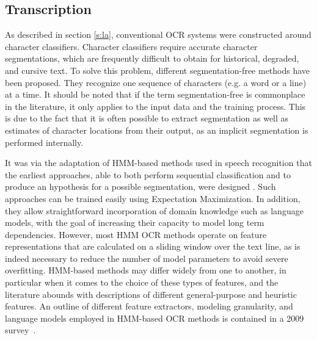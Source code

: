 \subsection{Transcription}

As described in section \ref{s:la}, conventional OCR systems were constructed
around character classifiers. Character classifiers require accurate character
segmentations, which are frequently difficult to obtain for historical,
degraded, and cursive text. To solve this problem, different segmentation-free
methods have been proposed. They recognize one sequence of characters (e.g. a
word or a line) at a time. It should be noted that if the term
segmentation-free is commonplace in the literature, it only applies to the
input data and the training process. This is due to the fact that it is often
possible to extract segmentation as well as estimates of character locations
from their output, as an implicit segmentation is performed internally.

It was via the adaptation of HMM-based methods used in speech recognition that
the earliest approaches, able to both perform sequential classification and to
produce an hypothesis for a possible segmentation, were designed
\cite{kaltenmeier1993sophisticated,rigoll1996comparison}. Such approaches can
be trained easily using Expectation Maximization. In addition, they allow
straightforward incorporation of domain knowledge such as language models, with
the goal of increasing their capacity to model long term dependencies. However,
most HMM OCR methods operate on feature representations that are calculated on
a sliding window over the text line, as is indeed necessary to reduce the
number of model parameters to avoid severe overfitting. HMM-based methods may
differ widely from one to another, in particular when it comes to the choice of
these types of features, and the literature abounds with descriptions of
different general-purpose and heuristic features. An outline of different
feature extractors, modeling granularity, and language models employed in
HMM-based OCR methods is contained in a 2009 survey~\cite{plotz2009markov}.

